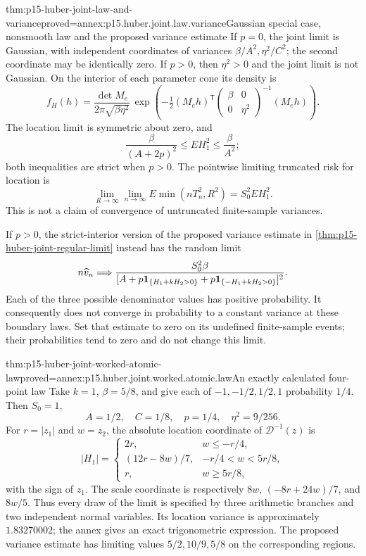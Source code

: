 \begin{hbtheorem}{thm:p15-huber-joint-law-and-variance}{proved=annex:p15.huber.joint.law.variance}{Gaussian special case, nonsmooth law and the proposed variance estimate}
If \(p=0\), the joint limit is Gaussian, with independent
coordinates of variances \(\beta/A^2,\eta^2/C^2\);
the second coordinate may be identically zero.
If \(p>0\), then \(\eta^2>0\) and the joint limit is not Gaussian.
On the interior of each parameter cone its density is
\[
 f_H(h)=\frac{\det M_e}{2\pi\sqrt{\beta\eta^2}}\,
      \exp\left(-\tfrac12(M_eh)^{\mathsf T}
                  \begin{pmatrix}\beta&0\\0&\eta^2\end{pmatrix}^{-1}
                         (M_eh)\right).
\]
The location limit is symmetric about zero, and
\[
 \frac{\beta}{(A+2p)^2}\leq E H_1^2\leq\frac{\beta}{A^2};
\]
both inequalities are strict when \(p>0\).
The pointwise limiting truncated risk for location is
\[
 \lim_{R\to\infty}\lim_{n\to\infty}
       E\min(nT_n^2,R^2)=S_0^2EH_1^2 .
\]
This is not a claim of convergence of untruncated finite-sample
variances.

If \(p>0\), the strict-interior version of the proposed variance
estimate in \cref{thm:p15-huber-joint-regular-limit} instead has
the random limit
\[
 n\widehat v_n\Longrightarrow
 \frac{S_0^2\beta}
 {[A+p{\bf1}_{\{H_1+kH_2>0\}}
     +p{\bf1}_{\{-H_1+kH_2>0\}}]^2}.
\]
Each of the three possible denominator values has positive
probability. It consequently does not converge in probability
to a constant variance at these boundary laws.
Set that estimate to zero on its undefined finite-sample events;
their probabilities tend to zero and do not change this limit.
\end{hbtheorem}

\begin{hbtheorem}{thm:p15-huber-joint-worked-atomic-law}{proved=annex:p15.huber.joint.worked.atomic.law}{An exactly calculated four-point law}
Take \(k=1\), \(\beta=5/8\), and give each of
\(-1,-1/2,1/2,1\) probability \(1/4\). Then \(S_0=1\),
\[
 A=1/2,\quad C=1/8,\quad p=1/4,\quad \eta^2=9/256.
\]
For \(r=|z_1|\) and \(w=z_2\), the absolute location coordinate
of \(\mathcal D^{-1}(z)\) is
\[
 |H_1|=
 \begin{cases}
 2r,&w\leq-r/4,\\
 (12r-8w)/7,&-r/4<w<5r/8,\\
 r,&w\geq5r/8,
 \end{cases}
\]
with the sign of \(z_1\). The scale coordinate is respectively
\(8w\), \((-8r+24w)/7\), and \(8w/5\).
Thus every draw of the limit is specified by three arithmetic
branches and two independent normal variables.
Its location variance is approximately \(1.83270002\);
the annex gives an exact trigonometric expression.
The proposed variance estimate has limiting values
\(5/2,10/9,5/8\) on the corresponding regions.
\end{hbtheorem}

